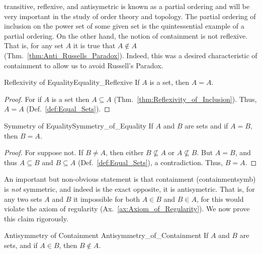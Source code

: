         transitive, reflexive, and antisymetric is known as a partial
        ordering and will be very important in the study of
        order theory and topology. The partial ordering of inclusion on the
        power set of some given set is the quintessential example of a partial
        ordering. On the other hand, the notion of containment is not reflexive.
        That is, for any set $A$ it is true that $A\notin{A}$
        (Thm.~\ref{thm:Anti_Russells_Paradox}). Indeed, this was a desired
        characteristic of containment to allow us to avoid Russell's
        Paradox.
        \begin{ltheorem}{Reflexivity of Equality}{Equality_Reflexive}
            If $A$ is a set, then $A=A$.
        \end{ltheorem}
        \begin{proof}
            For if $A$ is a set then $A\subseteq{A}$
            (Thm.~\ref{thm:Reflexivity_of_Inclusion}). Thus, $A=A$
            (Def.~\ref{def:Equal_Sets}).
        \end{proof}
        \begin{ltheorem}{Symmetry of Equality}{Symmetry_of_Equality}
            If $A$ and $B$ are sets and if $A=B$, then $B=A$.
        \end{ltheorem}
        \begin{proof}
            For suppose not. If $B\ne{A}$, then either $B\nsubseteq{A}$ or
            $A\nsubseteq{B}$. But $A=B$, and thus $A\subseteq{B}$  and
            $B\subseteq{A}$ (Def.~\ref{def:Equal_Sets}),
            a contradiction. Thus, $B=A$.
        \end{proof}
        An important but non-obvious statement is that containment
        (\gls{containmentsymb}) is \textit{not} symmetric, and indeed is the
        exact opposite, it is antisymetric. That is, for any two sets $A$ and
        $B$ it impossible for both $A\in{B}$ and $B\in{A}$, for this would
        violate the axiom of regularity
        (Ax.~\ref{ax:Axiom_of_Regularity}). We now prove this claim rigorously.
        \begin{ltheorem}{Antisymmetry of Containment}
                        {Antisymmetry_of_Containment}
            If $A$ and $B$ are sets, and if $A\in{B}$, then $B\notin{A}$.
        \end{ltheorem}
